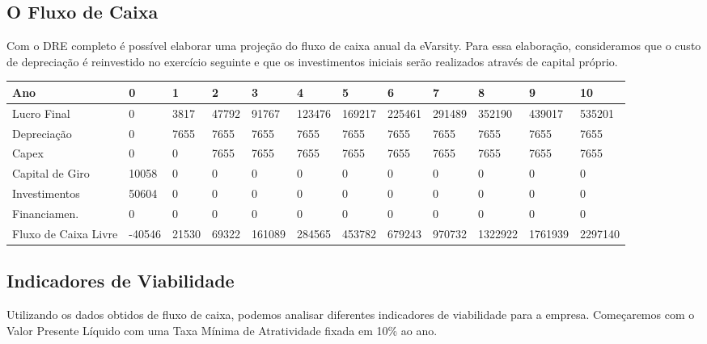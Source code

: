 \documentclass[a4paper, 12pt]{paper}
\begin{document}
\begin{landscape}
\subsection{O Fluxo de Caixa}
Com o DRE completo é possível elaborar uma projeção do fluxo de caixa anual da eVarsity. Para essa elaboração, consideramos que o custo de depreciação é reinvestido no exercício seguinte e que os investimentos iniciais serão realizados através de capital próprio.

	\begin{table}[ht]
		
		\begin{tabular}{p{5cm}p{1.2cm}p{1.2cm}p{1.2cm}p{1.2cm}p{1.2cm}p{1.2cm}p{1.2cm}p{1.2cm}p{1.2cm}p{1.2cm}p{1.2cm}}
		\hline
			\cellcolor{gray}Ano & \cellcolor{gray}0 & \cellcolor{gray}1 & \cellcolor{gray}2 & \cellcolor{gray}3 & \cellcolor{gray}4 & \cellcolor{gray}5 & \cellcolor{gray}6 & \cellcolor{gray}7 & \cellcolor{gray}8 &\cellcolor{gray} 9 & \cellcolor{gray}10 \\ \hline
	Lucro Final & 0 & 3817 & 47792 & 91767 & 123476 & 169217 & 225461 & 291489 & 352190 & 439017 & 535201 \\ \hline
	Depreciação & 0 & 7655 & 7655 & 7655 & 7655 & 7655 & 7655 & 7655 & 7655 & 7655 & 7655 \\ \hline
	Capex & 0 & 0 & 7655 & 7655 & 7655 & 7655 & 7655 & 7655 & 7655 & 7655 & 7655 \\ \hline
	Capital de Giro & 10058 & 0 & 0 & 0 & 0 & 0 & 0 & 0 & 0 & 0 & 0 \\ \hline
	Investimentos & 50604 & 0 & 0 & 0 & 0 & 0 & 0 & 0 & 0 & 0 & 0 \\ \hline
	Financiamen. & 0 & 0 & 0 & 0 & 0 & 0 & 0 & 0 & 0 & 0 & 0 \\ \hline
	Fluxo de Caixa Livre & -40546 & 21530 & 69322 & 161089 & 284565 & 453782 & 679243 & 970732 & 1322922 & 1761939 & 2297140 \\ \hline
		\end{tabular}
	\end{table}

\end{landscape}

\subsection{Indicadores de Viabilidade}
Utilizando os dados obtidos de fluxo de caixa, podemos analisar diferentes indicadores de viabilidade para a empresa. Começaremos com o Valor Presente Líquido com uma Taxa Mínima de Atratividade fixada em 10\% ao ano.
\end{document}
